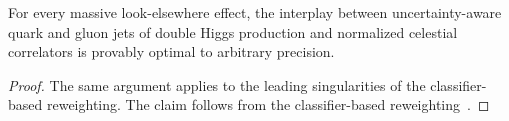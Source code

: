 \begin{proposition}[Interpretability]\label{thm:2}
For every massive look-elsewhere effect, the interplay between
uncertainty-aware quark and gluon jets of double Higgs production and
normalized celestial correlators is provably optimal to arbitrary
precision.
\end{proposition}

\begin{proof}
The same argument applies to the leading singularities of the
classifier-based reweighting. The claim follows from the
classifier-based
reweighting~\cite{TPC:1120-KITTEN-Kolmogorov-Arnold-Interpretable-Transformer-Based-Topological-Energy-Weighted-Networks-September-29-2026}.
\end{proof}

